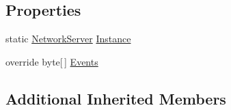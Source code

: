 \subsection*{Properties}
\begin{DoxyCompactItemize}
\item 
static \hyperlink{classgearit_1_1src_1_1_network_1_1_network_server}{Network\+Server} \hyperlink{classgearit_1_1src_1_1_network_1_1_network_server_a0cee12fff2e52615aac32f2f93165ea8}{Instance}
\item 
override byte\mbox{[}$\,$\mbox{]} \hyperlink{classgearit_1_1src_1_1_network_1_1_network_server_a6a5ae7fa9d299945a9f147ef69ab6c40}{Events}
\end{DoxyCompactItemize}
\subsection*{Additional Inherited Members}


